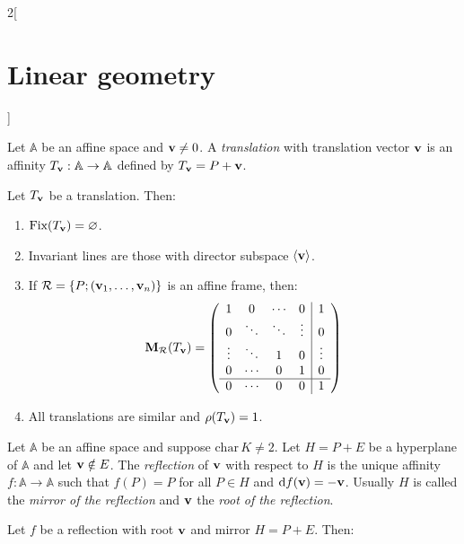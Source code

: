 \documentclass[../../../main_math.tex]{subfiles}
\begin{document}
\begin{multicols}{2}[\section{Linear geometry}]
\begin{definition}
  \end{definition}
  \begin{definition}[Translations]
    Let $\mathbb{A}$ be an affine space and $\boldsymbol{\mathrm{v}}\ne 0$. A \emph{translation} with translation vector $\boldsymbol{\mathrm{v}}$ is an affinity $T_{\boldsymbol{\mathrm{v}}}:\mathbb{A}\rightarrow\mathbb{A}$ defined by $T_{\boldsymbol{\mathrm{v}}}=P+\boldsymbol{\mathrm{v}}$.
  \end{definition}
  \begin{proposition}
    Let $T_{\boldsymbol{\mathrm{v}}}$ be a translation. Then:
    \begin{enumerate}
      \item $\text{Fix}(T_{\boldsymbol{\mathrm{v}}})=\varnothing$.
      \item Invariant lines are those with director subspace $\langle\boldsymbol{\mathrm{v}}\rangle$.
      \item If $\mathcal{R}=\{P;(\boldsymbol{\mathrm{v}}_1,\ldots,\boldsymbol{\mathrm{v}}_n)\}$ is an affine frame, then: $$\boldsymbol{\mathrm{M}}_\mathcal{R}(T_{\boldsymbol{\mathrm{v}}})=\left(\begin{array}{cccc|c}
                  1      & 0      & \cdots & 0      & 1      \\
                  0      & \ddots & \ddots & \vdots & 0      \\
                  \vdots & \ddots & 1      & 0      & \vdots \\
                  0      & \cdots & 0      & 1      & 0      \\
                  \hline
                  0      & \cdots & 0      & 0      & 1
                \end{array}\right)$$
      \item All translations are similar and $\rho(T_{\boldsymbol{\mathrm{v}}})=1$.
    \end{enumerate}
  \end{proposition}
  \begin{definition}[Reflections]
    Let $\mathbb{A}$ be an affine space and suppose $\text{char}\,K\ne 2$. Let $H=P+E$ be a hyperplane of $\mathbb{A}$ and let $\boldsymbol{\mathrm{v}}\notin E$. The \emph{reflection} of $\boldsymbol{\mathrm{v}}$ with respect to $H$ is the unique affinity $f:\mathbb{A}\rightarrow\mathbb{A}$ such that $f(P)=P$ for all $P\in H$ and $\dd{f(\boldsymbol{\mathrm{v}})}=-\boldsymbol{\mathrm{v}}$. Usually $H$ is called the \emph{mirror of the reflection} and $\boldsymbol{\mathrm{v}}$ the \emph{root of the reflection}.
  \end{definition}
  \begin{proposition}
    Let $f$ be a reflection with root $\boldsymbol{\mathrm{v}}$ and mirror $H=P+E$. Then:
    \begin{enumerate}

\end{enumerate}
\end{proposition}
\end{multicols}
\end{document}
